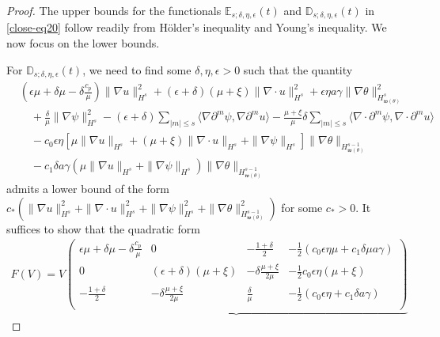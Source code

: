 \documentclass[reqno,11pt]{amsart}
\numberwithin{equation}{section}
\def\w{\mathfrak{w}}
\begin{document}
\begin{proof}

The upper bounds for the functionals $\mathbb{E}_{s;\delta,\eta,\epsilon}(t)$ and $\mathbb{D}_{s;\delta,\eta,\epsilon}(t)$ in \eqref{close-eq20} follow readily from H\"older's inequality and Young's inequality. We now focus on the lower bounds.

For $\mathbb{D}_{s;\delta,\eta, \epsilon}(t)$, we need to find some $\delta, \eta, \epsilon>0$ such that the quantity 
\begin{equation}\label{close-eq9}
\begin{aligned}
& (\epsilon \mu + \delta \mu  - \delta \frac{c_p}{\mu} ) \|\nabla u\|_{H^s}^2 + (\epsilon + \delta) (\mu + \xi ) \|\nabla \cdot u\|_{H^s}^2 + \epsilon \eta a \gamma \|\nabla \theta\|_{H_{ \w (\theta) }^s }^2 \\
& \quad + \frac{\delta}{\mu} \| \nabla \psi\|_{H^s}^2 - (\epsilon + \delta) \sum_{|m| \leq s} \langle \nabla \partial^m \psi, \nabla \partial^m u \rangle - \frac{\mu + \xi}{\mu} \delta \sum_{|m| \leq s} \langle \nabla \cdot \partial^m \psi, \nabla \cdot \partial^m u \rangle \\
& \quad - c_0 \epsilon \eta [ \mu \| \nabla u \|_{H^s} + (\mu + \xi) \| \nabla \cdot u \|_{H^s} + \| \nabla \psi \|_{H^s} ] \| \nabla \theta \|_{ H^{s-1}_{ \w (\theta) } } \\
& \quad - c_1 \delta a \gamma ( \mu \| \nabla u \|_{H^s} + \| \nabla \psi \|_{H^s} ) \| \nabla \theta \|_{ H^{s-1}_{ \w (\theta) } }
\end{aligned}
\end{equation}
admits a lower bound of the form $c_*(\|\nabla u\|^2_{H^s}+\|\nabla\cdot u\|^2_{H^s}+\|\nabla \psi\|^2_{H^s} + \| \nabla \theta \|_{ H^{s-1}_{ \w (\theta) } }^2)$ for some $c_*>0$. It suffices to show that the quadratic form
\begin{equation*}
\begin{aligned}
F(V) = V
\underbrace{
\begin{pmatrix}
\epsilon \mu + \delta \mu - \delta \frac{c_p}{\mu} & 0 & - \frac{1 + \delta}{2} & - \frac{1}{2} (c_0 \epsilon \eta \mu + c_1 \delta \mu a \gamma) \\
0 & (\epsilon + \delta) (\mu + \xi) & - \delta \frac{\mu + \xi}{2 \mu} & - \frac{1}{2} c_0 \epsilon \eta (\mu + \xi) \\
- \frac{1 + \delta}{2} & - \delta \frac{\mu + \xi}{2 \mu} & \frac{\delta}{\mu} & - \frac{1}{2} (c_0 \epsilon \eta + c_1 \delta a \gamma) \\

\end{pmatrix}}
\end{aligned}
\end{equation*}
\end{proof}
\end{document}
